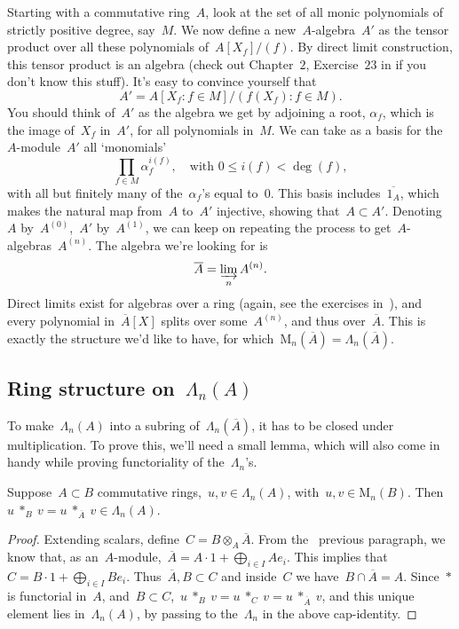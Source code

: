 Starting with a commutative ring~$A$, look at the set of all monic polynomials of strictly positive degree, say~$M$. We now define a new~$A$-algebra~$A'$ as the tensor product over all these polynomials of~$A[X_{f}]/(f)$. By direct limit construction, this tensor product is an algebra (check out Chapter~$2$, Exercise~$23$ in \cite{atiyah-macdonald} if you don't know this stuff). It's easy to convince yourself that
\begin{equation}
  A'=A[X_{f}:f \in M]/(f(X_{f}):f \in M).
\end{equation}
You should think of~$A'$ as the algebra we get by adjoining a root, $\alpha_{f}$, which is the image of~$X_{f}$ in~$A'$, for all polynomials in~$M$. We can take as a basis for the~$A$-module~$A'$ all `monomials'
\begin{equation}
  \prod_{f \in M} \alpha_{f}^{i(f)}, \quad\text{with } 0\leq i(f) < \deg(f), 
\end{equation}
with all but finitely many of the~$\alpha_{f}$'s equal to~$0$. This basis includes~$\overline{1_{A}}$, which makes the natural map from~$A$ to~$A'$ injective, showing that~$A \subset A'$. Denoting~$A$ by~$A^{(0)}$,~$A'$ by~$A^{(1)}$, we can keep on repeating the process to get~$A$-algebras~$A^{(n)}$. The algebra we're looking for is
\begin{equation}
  \overline{A}=\varinjlim_{n} A^{(n)}. 
\end{equation}
Direct limits exist for algebras over a ring (again, see the exercises in~\cite{atiyah-macdonald}), and every polynomial in~$\overline{A}[X]$ splits over some~$A^{(n)}$, and thus over~$\overline{A}$. This is exactly the structure we'd like to have, for which~$\mathrm{M}_{n}(\overline{A})=\Lambda_{n}(\overline{A})$.

\subsection{Ring structure on~$\Lambda_{n}(A)$}

To make~$\Lambda_{n}(A)$ into a subring of~$\Lambda_{n}(\overline{A})$, it has to be closed under multiplication. To prove this, we'll need a small lemma, which will also come in handy while proving functoriality of the~$\Lambda_{n}$'s.

\begin{lemma}
  Suppose~$A \subset B$ commutative rings,~$u,v \in \Lambda_{n}(A)$, with~$u, v \in \mathrm{M}_{n}(B)$. Then~$u \ *_{B} \ v = u \ *_{\overline{A}} \ v \in \Lambda_{n}(A)$.

  \begin{proof}
    Extending scalars, define~$C=B \otimes_{A} \overline{A}$. From the  previous paragraph, we know that, as an~$A$-module,~$\overline{A}=A \cdot 1 + \bigoplus_{i \in I} Ae_{i}$. This implies that~$C=B \cdot 1 + \bigoplus_{i \in I} Be_{i}$. Thus~$\overline{A}, B \subset C$ and inside~$C$ we have~$B \cap \overline{A}=A$. Since~$*$ is functorial in~$A$, and~$B \subset C$,~$u \ *_{B} \ v=u \ *_{C} \ v=u \ *_{\overline{A}} \ v$, and this unique element lies in~$\Lambda_{n}(A)$, by passing to the~$\Lambda_{n}$ in the above cap-identity.
  \end{proof}
\end{lemma}

